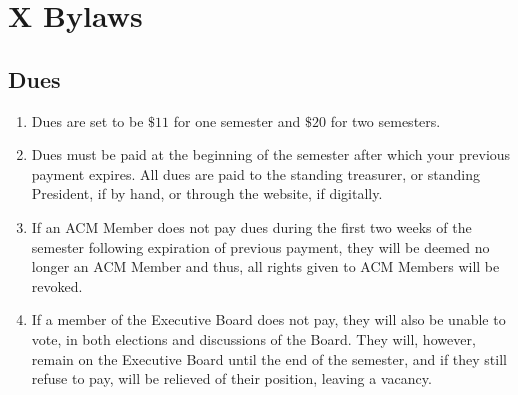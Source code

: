 
\section{X \textendash{} Bylaws}
\subsection{Dues}
\begin{enumerate}
  \item	Dues are set to be $\$11$ for one semester and $\$20$ for two semesters.
  \item	Dues must be paid at the beginning of the semester after which your
  previous payment expires. All dues are paid to the standing treasurer, or
  standing President, if by hand, or
  through the website, if digitally.
  \item If an ACM Member does not pay dues during the first two weeks of the
  semester following expiration of previous payment, they will be deemed no
  longer an ACM Member and thus, all rights given to ACM Members will be
  revoked.
  \item If a member of the Executive Board does not pay, they will also be unable to
  vote, in both elections and discussions of the Board. They will, however,
  remain on the Executive Board until the end of the semester, and if they still
  refuse to pay, will be relieved of their position, leaving a vacancy.
\end{enumerate}
